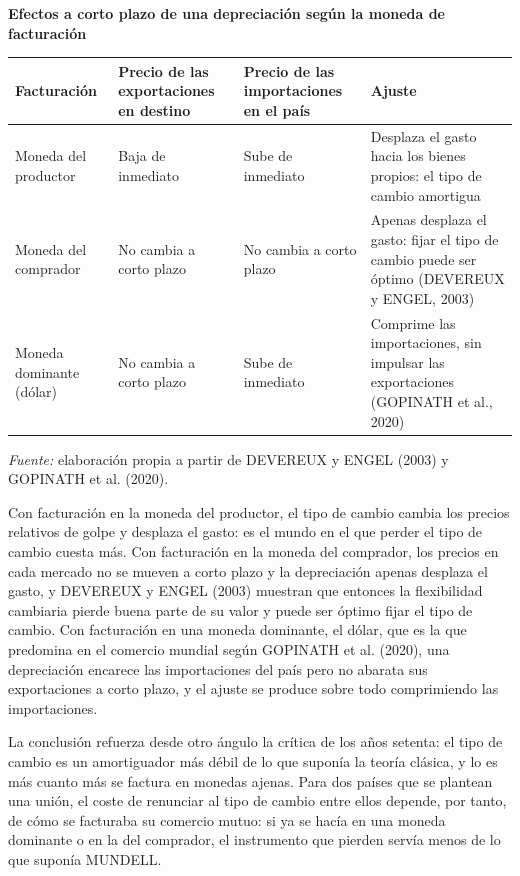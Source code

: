 \documentclass[10pt,a4paper]{article}
\begin{document}
\begin{center}\begin{minipage}{\linewidth}\centering
{\small\textbf{Efectos a corto plazo de una depreciación según la moneda de facturación}}\par\vspace{0.3em}
{\footnotesize
\begin{tabular}{p{2.6cm}p{3.1cm}p{3.1cm}p{4.2cm}}
\hline
\textbf{Facturación} & \textbf{Precio de las exportaciones en destino} & \textbf{Precio de las importaciones en el país} & \textbf{Ajuste}\tabularnewline
\hline
Moneda del productor & Baja de inmediato & Sube de inmediato & Desplaza el gasto hacia los bienes propios: el tipo de cambio amortigua\tabularnewline
Moneda del comprador & No cambia a corto plazo & No cambia a corto plazo & Apenas desplaza el gasto: fijar el tipo de cambio puede ser óptimo (DEVEREUX y ENGEL, 2003)\tabularnewline
Moneda dominante (dólar) & No cambia a corto plazo & Sube de inmediato & Comprime las importaciones, sin impulsar las exportaciones (GOPINATH et al., 2020)\tabularnewline
\hline
\end{tabular}}\par\vspace{0.3em}
{\small\textit{Fuente: }elaboración propia a partir de DEVEREUX y ENGEL (2003) y GOPINATH et al. (2020).}
\end{minipage}\end{center}

Con facturación en la moneda del productor, el tipo de cambio cambia los precios relativos de golpe y desplaza el gasto: es el mundo en el que perder el tipo de cambio cuesta más. Con facturación en la moneda del comprador, los precios en cada mercado no se mueven a corto plazo y la depreciación apenas desplaza el gasto, y DEVEREUX y ENGEL (2003) muestran que entonces la flexibilidad cambiaria pierde buena parte de su valor y puede ser óptimo fijar el tipo de cambio. Con facturación en una moneda dominante, el dólar, que es la que predomina en el comercio mundial según GOPINATH et al. (2020), una depreciación encarece las importaciones del país pero no abarata sus exportaciones a corto plazo, y el ajuste se produce sobre todo comprimiendo las importaciones.

La conclusión refuerza desde otro ángulo la crítica de los años setenta: el tipo de cambio es un amortiguador más débil de lo que suponía la teoría clásica, y lo es más cuanto más se factura en monedas ajenas. Para dos países que se plantean una unión, el coste de renunciar al tipo de cambio entre ellos depende, por tanto, de cómo se facturaba su comercio mutuo: si ya se hacía en una moneda dominante o en la del comprador, el instrumento que pierden servía menos de lo que suponía MUNDELL.
\end{document}
